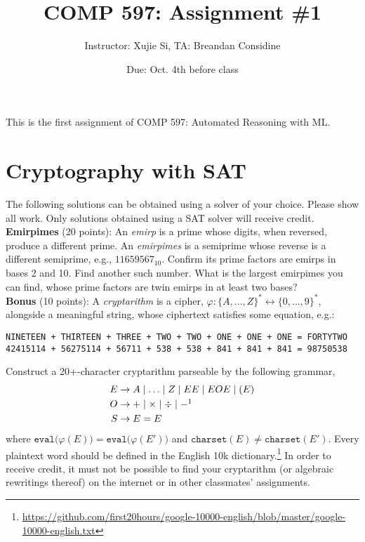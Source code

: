 \documentclass[11pt]{article}
\author{Instructor: Xujie Si, TA: Breandan Considine}
\date{Due: Oct. 4th before class}
\title{COMP 597: Assignment \#1}
\begin{document}
    \maketitle
    \noindent This is the first assignment of COMP 597: Automated Reasoning with ML.


    \section{Cryptography with SAT}

    The following solutions can be obtained using a solver of your choice. Please show all work. Only solutions obtained using a SAT solver will receive credit.\\

    \noindent \textbf{Emirpimes} (20 points): An \textit{emirp} is a prime whose digits, when reversed, produce a different prime. An \textit{emirpimes} is a semiprime whose reverse is a different semiprime, e.g., $11659567_{10}$. Confirm its prime factors are emirps in bases 2 and 10. Find another such number. What is the largest emirpimes you can find, whose prime factors are twin emirps in at least two bases?\\

    \noindent \textbf{Bonus} (10 points): A \textit{cryptarithm} is a cipher, $\varphi: \{A,\ldots, Z\}^*\leftrightarrow \{0, \ldots, 9\}^*$, alongside a meaningful string, whose ciphertext satisfies some equation, e.g.:

    \begin{lstlisting}[basicstyle=\scriptsize\ttfamily]
NINETEEN + THIRTEEN + THREE + TWO + TWO + ONE + ONE + ONE = FORTYTWO
42415114 + 56275114 + 56711 + 538 + 538 + 841 + 841 + 841 = 98750538
    \end{lstlisting}

    \noindent Construct a 20+-character cryptarithm parseable by the following grammar,
    \begin{align*}
E &\rightarrow A \mid \ldots \mid Z \mid EE \mid E O E \mid ( E )\\
O &\rightarrow + \mid \times \mid \div \mid -\footnotemark\\
S &\rightarrow E = E
    \end{align*}
    \noindent where $\texttt{eval}\big(\varphi(E)\big) = \texttt{eval}\big(\varphi(E')\big)$ and $\texttt{charset}(E) \neq \texttt{charset}(E')$. Every plaintext word should be defined in the English 10k dictionary.\footnote{\tiny\url{https://github.com/first20hours/google-10000-english/blob/master/google-10000-english.txt}} In order to receive credit, it must not be possible to find your cryptarithm (or algebraic rewritings thereof) on the internet or in other classmates' assignments.\\
\end{document}
